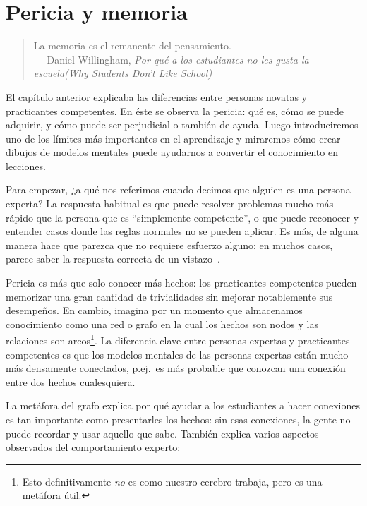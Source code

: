 \chapter{Pericia y memoria}\label{s:memory}

\begin{quote}

  La memoria es el remanente del pensamiento. \\
  --- Daniel Willingham, \emph{Por qué a los estudiantes no les gusta la escuela(Why Students Don't Like School)}

\end{quote}

El capítulo anterior explicaba las diferencias entre personas novatas y practicantes competentes.
En  éste se observa la pericia:
qué es,
cómo se puede adquirir,
y cómo puede ser perjudicial o también de ayuda.
Luego introduciremos uno de los límites más importantes en el aprendizaje
y miraremos cómo crear dibujos de modelos mentales puede ayudarnos a convertir el conocimiento en lecciones.

Para empezar,
¿a qué nos referimos cuando decimos que alguien es una persona experta?
La respuesta habitual es que puede resolver problemas mucho más rápido que la persona que es “simplemente competente'',
o que puede reconocer y entender casos donde las reglas normales no se pueden aplicar.
Es más, de alguna manera hace que parezca que no requiere esfuerzo alguno:
en muchos casos,
parece saber la respuesta correcta de un vistazo~\cite{Parn2017}.

Pericia es más que solo conocer más hechos:
los practicantes competentes pueden memorizar una gran cantidad de trivialidades sin  mejorar notablemente sus desempeños.
En cambio,
imagina por un momento que almacenamos conocimiento como una red o grafo en la cual los hechos son nodos
y las relaciones son arcos\footnote{Esto definitivamente \emph{no} es como nuestro cerebro trabaja, pero es una metáfora útil.}.
La diferencia clave entre personas expertas y practicantes competentes es que
los modelos mentales de las  personas expertas están mucho más densamente conectados, 
p.ej.\ es más probable que conozcan una conexión entre dos hechos cualesquiera.

La metáfora del grafo explica por qué  ayudar a los estudiantes a hacer conexiones es tan importante como presentarles los hechos:
sin esas conexiones,
la gente no puede recordar y usar aquello que sabe.
También explica varios aspectos observados del comportamiento experto:

